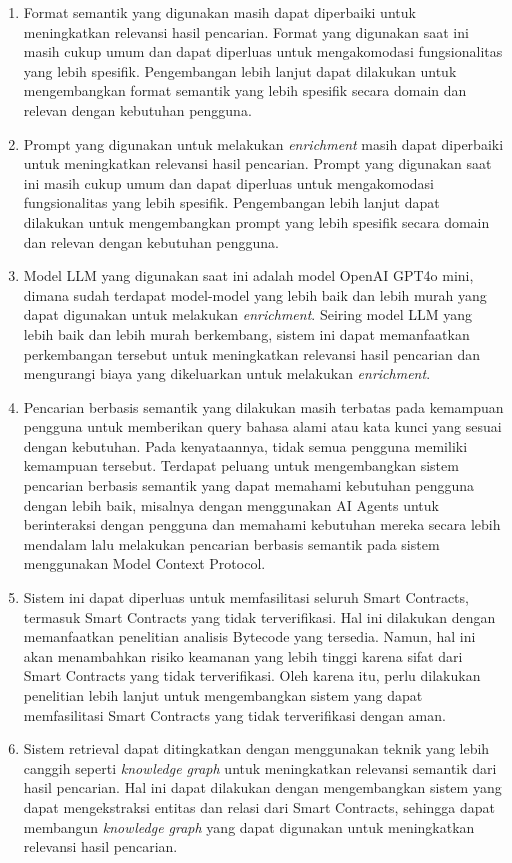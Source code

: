 \begin{enumerate}
    \item Format semantik yang digunakan masih dapat diperbaiki untuk meningkatkan relevansi hasil pencarian. Format yang digunakan saat ini masih cukup umum dan dapat diperluas untuk mengakomodasi fungsionalitas yang lebih spesifik. Pengembangan lebih lanjut dapat dilakukan untuk mengembangkan format semantik yang lebih spesifik secara domain dan relevan dengan kebutuhan pengguna.
    \item Prompt yang digunakan untuk melakukan \textit{enrichment} masih dapat diperbaiki untuk meningkatkan relevansi hasil pencarian. Prompt yang digunakan saat ini masih cukup umum dan dapat diperluas untuk mengakomodasi fungsionalitas yang lebih spesifik. Pengembangan lebih lanjut dapat dilakukan untuk mengembangkan prompt yang lebih spesifik secara domain dan relevan dengan kebutuhan pengguna.
    \item Model LLM yang digunakan saat ini adalah model OpenAI GPT4o mini, dimana sudah terdapat model-model yang lebih baik dan lebih murah yang dapat digunakan untuk melakukan \textit{enrichment}. Seiring model LLM yang lebih baik dan lebih murah berkembang, sistem ini dapat memanfaatkan perkembangan tersebut untuk meningkatkan relevansi hasil pencarian dan mengurangi biaya yang dikeluarkan untuk melakukan \textit{enrichment}.
    \item Pencarian berbasis semantik yang dilakukan masih terbatas pada kemampuan pengguna untuk memberikan query bahasa alami atau kata kunci yang sesuai dengan kebutuhan. Pada kenyataannya, tidak semua pengguna memiliki kemampuan tersebut. Terdapat peluang untuk mengembangkan sistem pencarian berbasis semantik yang dapat memahami kebutuhan pengguna dengan lebih baik, misalnya dengan menggunakan AI Agents untuk berinteraksi dengan pengguna dan memahami kebutuhan mereka secara lebih mendalam lalu melakukan pencarian berbasis semantik pada sistem menggunakan Model Context Protocol.
    \item Sistem ini dapat diperluas untuk memfasilitasi seluruh Smart Contracts, termasuk Smart Contracts yang tidak terverifikasi. Hal ini dilakukan dengan memanfaatkan penelitian analisis Bytecode yang tersedia. Namun, hal ini akan menambahkan risiko keamanan yang lebih tinggi karena sifat dari Smart Contracts yang tidak terverifikasi. Oleh karena itu, perlu dilakukan penelitian lebih lanjut untuk mengembangkan sistem yang dapat memfasilitasi Smart Contracts yang tidak terverifikasi dengan aman.
    \item Sistem retrieval dapat ditingkatkan dengan menggunakan teknik yang lebih canggih seperti \textit{knowledge graph} untuk meningkatkan relevansi semantik dari hasil pencarian. Hal ini dapat dilakukan dengan mengembangkan sistem yang dapat mengekstraksi entitas dan relasi dari Smart Contracts, sehingga dapat membangun \textit{knowledge graph} yang dapat digunakan untuk meningkatkan relevansi hasil pencarian.

\end{enumerate}
